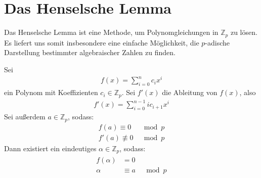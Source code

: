\documentclass{report}
\newcommand{\bZ}{\mathbb{Z}}
\begin{document}
	\chapter{Das Henselsche Lemma}
	Das Henselsche Lemma ist eine Methode, um Polynomgleichungen in $\bZ_p$ zu lösen. Es liefert uns somit insbesondere eine einfache Möglichkeit, die $p$-adische Darstellung bestimmter algebraischer Zahlen zu finden.
	\begin{theorem}
		Sei 
		\begin{align*}
			f(x) = \sum_{i = 0}^n c_i x^i
		\end{align*}
		ein Polynom mit Koeffizienten $c_i \in \bZ_p$. Sei $f'(x)$ die Ableitung von $f(x)$, also
		\begin{align*}
			f'(x) = \sum_{i = 0}^{n-1} ic_{i+1} x^i
		\end{align*}
		Sei außerdem $a \in \bZ_p$, sodass:
		\begin{align*}
			f(a) \equiv 0 &\mod p\\
			f'(a) \not\equiv 0 &\mod p
		\end{align*}
		Dann existiert ein eindeutiges $\alpha \in \bZ_p$, sodass:
		\begin{align*}
			\begin{array}{rll}
				f(\alpha) &= 0\\
				\alpha &\equiv a &\mod p
			\end{array}
		\end{align*}
	\end{theorem}
\end{document}
